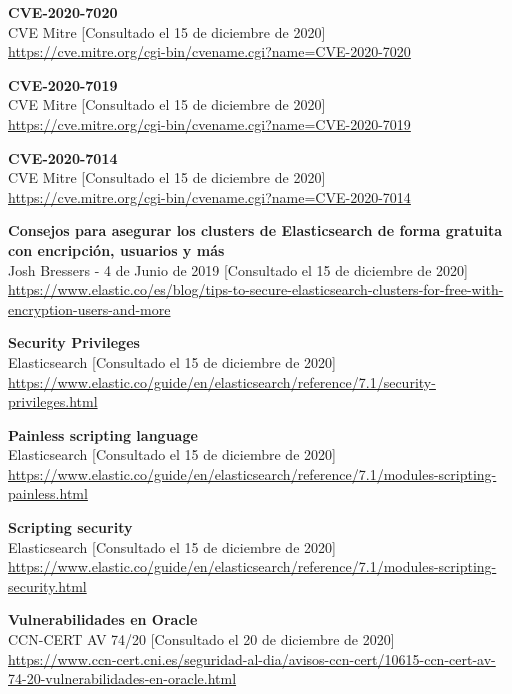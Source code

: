 \documentclass[a4paper,oneside]{article}
\begin{document}
\begin{thebibliography}{9}
	\textbf{CVE-2020-7020}\\
	CVE Mitre [Consultado el 15 de diciembre de 2020]\\
	\url{https://cve.mitre.org/cgi-bin/cvename.cgi?name=CVE-2020-7020}

	\textbf{CVE-2020-7019}\\
	CVE Mitre [Consultado el 15 de diciembre de 2020]\\
	\url{https://cve.mitre.org/cgi-bin/cvename.cgi?name=CVE-2020-7019}

	\textbf{CVE-2020-7014}\\
	CVE Mitre [Consultado el 15 de diciembre de 2020]\\
	\url{https://cve.mitre.org/cgi-bin/cvename.cgi?name=CVE-2020-7014}

	\textbf{Consejos para asegurar los clusters de Elasticsearch de forma gratuita con encripción, usuarios y más}\\
	Josh Bressers - 4 de Junio de 2019  [Consultado el 15 de diciembre de 2020]\\
	\url{https://www.elastic.co/es/blog/tips-to-secure-elasticsearch-clusters-for-free-with-encryption-users-and-more}

	\textbf{Security Privileges}\\
	Elasticsearch [Consultado el 15 de diciembre de 2020]\\
	\url{https://www.elastic.co/guide/en/elasticsearch/reference/7.1/security-privileges.html}
	
	\textbf{Painless scripting language}\\
	Elasticsearch [Consultado el 15 de diciembre de 2020]\\
	\url{https://www.elastic.co/guide/en/elasticsearch/reference/7.1/modules-scripting-painless.html}
	
	\textbf{Scripting security}\\
	Elasticsearch [Consultado el 15 de diciembre de 2020]\\
	\url{https://www.elastic.co/guide/en/elasticsearch/reference/7.1/modules-scripting-security.html}

	\textbf{Vulnerabilidades en Oracle}\\
	CCN-CERT AV 74/20 [Consultado el 20 de diciembre de 2020]\\
	\url{https://www.ccn-cert.cni.es/seguridad-al-dia/avisos-ccn-cert/10615-ccn-cert-av-74-20-vulnerabilidades-en-oracle.html}


\end{thebibliography}
\end{document}

